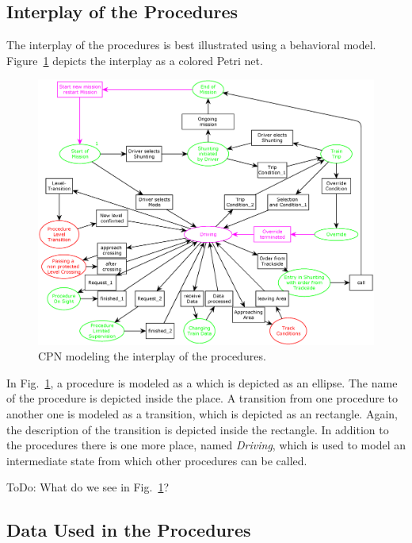 \documentclass{template/openetcs_article}
\begin{document}
\subsection{Interplay of the Procedures}

The interplay of the procedures is best illustrated using a behavioral model. Figure~\ref{fig:Bild1} depicts the interplay as a colored Petri net. 

\begin{figure}[htb] 
  \centering
     \includegraphics[width=1.0\textwidth]{Aufrufbaum.eps}
  \caption{CPN modeling the interplay of the procedures.}
  \label{fig:Bild1}
\end{figure}

In Fig.~\ref{fig:Bild1}, a procedure is modeled as a  which is depicted as an ellipse. The name of the procedure is depicted inside the place. A transition from one procedure to another one is modeled as a transition, which is depicted as an rectangle. Again, the description of the transition is depicted inside the rectangle. In addition to the procedures there is one more place, named \textit{Driving}, which is used to model an intermediate state from which other procedures can be called.

ToDo: What do we see in Fig.~\ref{fig:Bild1}?

\subsection{Data Used in the Procedures}
\end{document}
